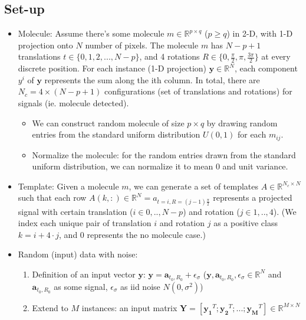 \documentclass[11pt]{article}
\newcommand{\R}{\mathbb{R}}
\begin{document}
\subsection{Set-up}
\begin{itemize}
    \item Molecule: Assume there's some molecule $m \in \R^{p \times q}$ ($p\ge q$) in 2-D, with 1-D projection onto $N$ number of pixels. The molecule $m$ has $N-p+1$ translations $t \in \{0,1,2,...,N-p\}$, and 4 rotations $R \in \{0, \frac{\pi}{2}, \pi, \frac{3\pi}{2}\}$ at every discrete position. For each instance (1-D projection) $\mathbf{y} \in \R^N$, each component $y^i$ of $\mathbf{y}$ represents the sum along the ith column. In total, there are $N_c = 4\times(N-p+1)$ configurations (set of translations and rotations) for signals (ie. molecule detected). 
    \begin{itemize}
        \item We can construct random molecule of size $p\times q$ by drawing random entries from the standard uniform distribution $U(0,1)$ for each $m_{ij}$. 
        \item Normalize the molecule: for the random entries drawn from the standard uniform distribution, we can normalize it to mean 0 and unit variance.
    \end{itemize}
    \item Template: Given a molecule $m$, we can generate a set of templates $A \in \R^{N_c \times N}$ such that each row $A(k,:) \in \R^N = a_{t=i, R=(j-1)\frac{\pi}{2}}$ represents a projected signal with certain translation ($i \in {0,..,N-p}$) and rotation ($j \in {1,..,4}$). (We index each unique pair of translation $i$ and rotation $j$ as a positive class $k=i+4\cdot j$, and $0$ represents the no molecule case.)
    \item Random (input) data with noise:
    \begin{enumerate}
        \item Definition of an input vector $\mathbf{y}$: $\mathbf{y} =  \mathbf{a}_{t_0,R_0} + \epsilon_\sigma$ ($\mathbf{y}, \mathbf{a}_{t_0,R_0}, \epsilon_\sigma \in \R^N$ and $ \mathbf{a}_{t_0,R_0}$ as some signal, $\epsilon_\sigma$ as iid noise $N(0, \sigma^2)$)
        \item Extend to $M$ instances: an input matrix $\mathbf{Y} = [\mathbf{y_1}^T; \mathbf{y_2}^T; ...; \mathbf{y_M}^T] \in \R^{M\times N}$
    \end{enumerate}
    \end{itemize}
    
\end{document}
